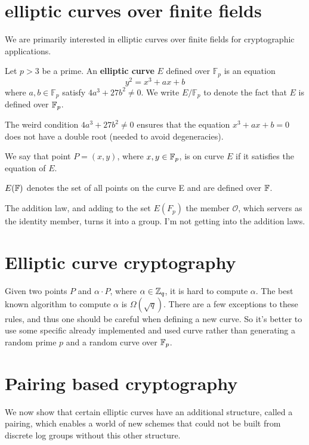 \section{elliptic curves over finite fields}
We are primarily interested in elliptic curves over finite fields for cryptographic applications.
\begin{defn}
  Let $p >3 $ be a prime. An \textbf{elliptic curve} $E$ defined over $\mathbb{F}_p$ is an 
  equation  
  $$ y^2 = x^3 +ax + b$$
  where $a,b \in \mathbb{F}_p$ satisfy $4a^3 +27b^2 \neq 0$. We write $E/\mathbb{F}_p$ to denote
  the fact that $E$ is defined over $\mathbb{F}_p$.
\end{defn}
The weird condition $4a^3 +27b^2 \neq 0 $ ensures that the equation 
$ x^3 + ax + b = 0$ does not have a double root (needed to avoid degeneracies).

\begin{defn}
  We say that point $P=(x,y)$, where $x,y \in \mathbb{F}_p$, is on curve $E$ if it satisfies the equation of $E$.
\end{defn}
\begin{defn}
  $E(\mathbb{F})$ denotes the set of all points on the curve E and are defined over $\mathbb{F}$.
\end{defn}

The addition law, and adding to the set $E(F_p)$ the member $\mathcal{O}$,
 which servers as the identity member, turns it into a group. I'm not getting into the addition laws.

\section{Elliptic curve cryptography}
Given two points $P$ and $\alpha \cdot P$, where $\alpha \in \mathbb{Z}_q$, it is hard to compute $\alpha$.
The best known algorithm to compute $\alpha$ is $\Omega(\sqrt{q})$.
There are a few exceptions to these rules, and thus one should be careful when defining a new curve.
So it's better to use some specific already implemented and used curve rather than 
generating a random prime $p$ and a random curve over $\mathbb{F}_p$.
\section{Pairing based cryptography}
We now show that certain elliptic curves have an additional structure,
called a pairing, which enables a world of new schemes that could not be built
 from discrete log groups without this other structure.

